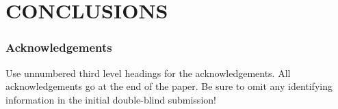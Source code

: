 \documentclass[twoside]{article}
\begin{document}
\section{CONCLUSIONS}
\label{sec:conc}


\subsubsection*{Acknowledgements}

Use unnumbered third level headings for the acknowledgements.  All
acknowledgements go at the end of the paper.  Be sure to omit any
identifying information in the initial double-blind submission!
\fi

\clearpage\newpage


\end{document}
